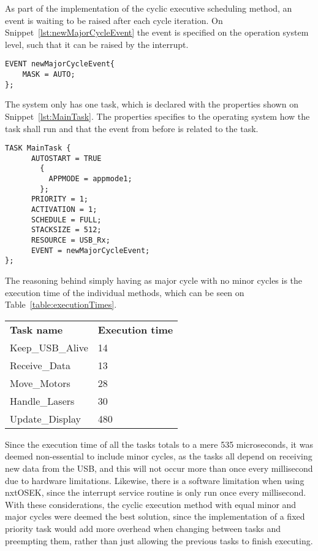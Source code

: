 As part of the implementation of the cyclic executive scheduling method, an event is waiting to be raised after each cycle iteration.
On Snippet~\ref{lst:newMajorCycleEvent} the event is specified on the operation system level, such that it can be raised by the interrupt.
\begin{lstlisting}[language=CSharp,label={lst:newMajorCycleEvent},caption={newMajorCycleEvent event from nxt.oil}]
EVENT newMajorCycleEvent{
    MASK = AUTO;
};
\end{lstlisting}

The system only has one task, which is declared with the properties shown on Snippet~\ref{lst:MainTask}.
The properties specifies to the operating system how the task shall run and that the event from before is related to the task.
\begin{lstlisting}[language=CSharp,label={lst:MainTaskoil},caption={MainTaks task from nxt.oil}]
    TASK MainTask {
      AUTOSTART = TRUE
        {
          APPMODE = appmode1;
        };
      PRIORITY = 1;
      ACTIVATION = 1;
      SCHEDULE = FULL;
      STACKSIZE = 512;
      RESOURCE = USB_Rx;
      EVENT = newMajorCycleEvent;
};
\end{lstlisting}

The reasoning behind simply having as major cycle with no minor cycles is the execution time of the individual methods, which can be seen on Table~\ref{table:executionTimes}.

\begin{table}[tbp]
\begin{tabular}{ll}
\textbf{Task name}  & \textbf{Execution time} \\
Keep\_USB\_Alive    & 14                            \\
Receive\_Data       & 13                            \\
Move\_Motors        & 28                            \\
Handle\_Lasers      & 30                            \\
Update\_Display     & 480                           \\
\end{tabular}
\end{table}\label{table:executionTimes}

Since the execution time of all the tasks totals to a mere 535 microseconds, it was deemed non-essential to include minor cycles, as the tasks all depend on receiving new data from the USB, and this will not occur more than once every millisecond due to hardware limitations.
Likewise, there is a software limitation when using nxtOSEK, since the interrupt service routine is only run once every millisecond.
With these considerations, the cyclic execution method with equal minor and major cycles were deemed the best solution, since the implementation of a fixed priority task would add more overhead when changing between tasks and preempting them, rather than just allowing the previous tasks to finish executing.

